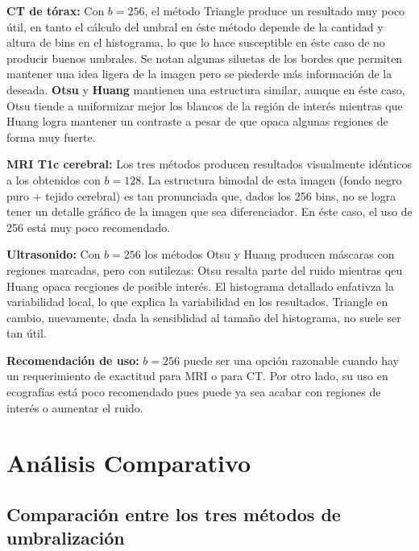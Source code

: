 \documentclass[12pt, a4paper]{article}
\begin{document}
\textbf{CT de tórax:} Con $b = 256$, el método Triangle produce un resultado muy poco útil, en tanto el cálculo del umbral
en éste método depende de la cantidad y altura de bins en el histograma, lo que lo hace susceptible en éste caso de no producir buenos umbrales.
Se notan algunas siluetas de los bordes que permiten mantener una idea ligera de la imagen pero se piederde más información de la deseada. 
\textbf{Otsu} y
\textbf{Huang} mantienen una estructura similar, aunque en éste caso, Otsu tiende a uniformizar mejor los blancos de la región de interés mientras que
Huang logra mantener un contraste a pesar de que opaca algunas regiones de forma muy fuerte.

\textbf{MRI T1c cerebral:} Los tres métodos producen resultados visualmente idénticos a
los obtenidos con $b = 128$. La estructura bimodal de esta imagen (fondo negro puro +
tejido cerebral) es tan pronunciada que, dados los 256 bins, no se logra tener un detalle gráfico de la imagen que sea diferenciador.
En éste caso, el uso de 256 está muy poco recomendado.

\textbf{Ultrasonido:} Con $b = 256$ los métodos Otsu y Huang producen máscaras con regiones
marcadas, pero con sutilezas: Otsu resalta parte del ruido mientras qeu Huang opaca recgiones de posible interés. 
El histograma detallado enfativza la variabilidad local, lo que explica la variabilidad en los resultados.
Triangle en cambio, nuevamente, dada la sensiblidad al tamaño del histograma, no suele ser tan útil.

\textbf{Recomendación de uso:} $b = 256$ puede ser una opción razonable cuando hay un requerimiento
de exactitud para MRI o para CT. Por otro lado, su uso en ecografías está poco recomendado pues puede 
ya sea acabar con regiones de interés o aumentar el ruido.
\newpage
\section{Análisis Comparativo}

\subsection{Comparación entre los tres métodos de umbralización}
\end{document}
